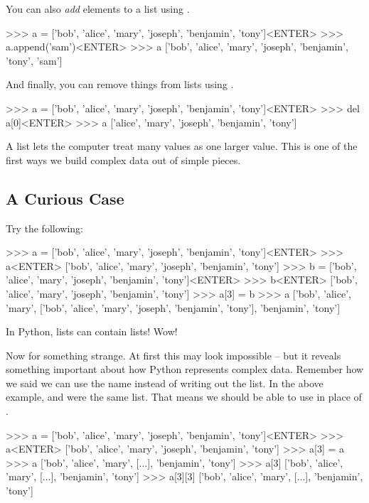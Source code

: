 You can also \emph{add} elements to a list using .

\begin{replbox}
>>> a = ['bob', 'alice', 'mary', 'joseph', 'benjamin', 'tony']<ENTER>
>>> a.append('sam')<ENTER>
>>> a
['bob', 'alice', 'mary', 'joseph', 'benjamin', 'tony', 'sam']
\end{replbox}

And finally, you can remove things from lists using .
\begin{replbox}
>>> a = ['bob', 'alice', 'mary', 'joseph', 'benjamin', 'tony']<ENTER>
>>> del a[0]<ENTER>
>>> a
['alice', 'mary', 'joseph', 'benjamin', 'tony']
\end{replbox}

\begin{BigIdeaBox}
  A list lets the computer treat many values as one larger value. This is one of the first ways we build complex data out of simple pieces.
\end{BigIdeaBox}

\subsection{A Curious Case}

Try the following:

\begin{replbox}
>>> a = ['bob', 'alice', 'mary', 'joseph', 'benjamin', 'tony']<ENTER>
>>> a<ENTER>
['bob', 'alice', 'mary', 'joseph', 'benjamin', 'tony']
>>> b = ['bob', 'alice', 'mary', 'joseph', 'benjamin', 'tony']<ENTER>
>>> b<ENTER>
['bob', 'alice', 'mary', 'joseph', 'benjamin', 'tony']
>>> a[3] = b
>>> a
['bob', 'alice', 'mary', ['bob', 'alice', 'mary', 'joseph', 'benjamin', 'tony'], 'benjamin', 'tony']
\end{replbox}

In Python, lists can contain lists! Wow!

Now for something strange. At first this may look impossible -- but it reveals something important
about how Python represents complex data. Remember how we said we can use the name instead of
writing out the list. In the above example,  and  were the same list. That means we
should be able to use  in place of .

\begin{replbox}
>>> a = ['bob', 'alice', 'mary', 'joseph', 'benjamin', 'tony']<ENTER>
>>> a<ENTER>
['bob', 'alice', 'mary', 'joseph', 'benjamin', 'tony']
>>> a[3] = a
>>> a
['bob', 'alice', 'mary', [...], 'benjamin', 'tony']
>>> a[3]
['bob', 'alice', 'mary', [...], 'benjamin', 'tony']
>>> a[3][3]
['bob', 'alice', 'mary', [...], 'benjamin', 'tony']
\end{replbox}

